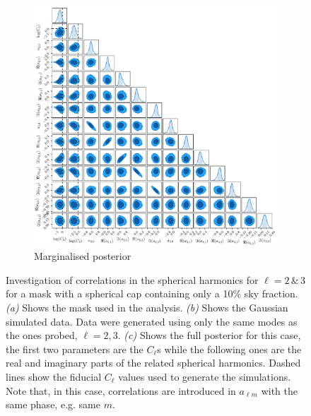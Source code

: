 \begin{figure}
\begin{subfigure}[b]{\textwidth}
 \includegraphics[width=\textwidth]{BPL-FIGS/RandomBand_fsky_01_trianglePlot.pdf}
  \caption{Marginalised posterior}
  \label{fig:BPL:PoleTri}
\end{subfigure}
\caption[Investigation of correlation spherical harmonics for $\ell = 2\, \& \, 3$ for a mask with a spherical cap containing only a 10\% sky fraction]{Investigation of correlations in the spherical harmonics for $\ell = 2\, \& \, 3$ for a mask with a spherical cap containing only a 10\% sky fraction. \textit{(a)} Shows the mask used in the analysis. \textit{(b)} Shows the Gaussian simulated data. Data were generated using only the same modes as the ones probed, $\ell = 2,3$. \textit{(c)} Shows the full posterior for this case, the first two parameters are the $C_{\ell}$s while the following ones are the real and imaginary parts of the related spherical harmonics. Dashed lines show the fiducial $C_{\ell}$ values used to generate the simulations. Note that, in this case, correlations are introduced in $a_{\ell m}$ with the same phase, e.g. same $m$.}
\label{fig:BPL:Pole}
\end{figure}

